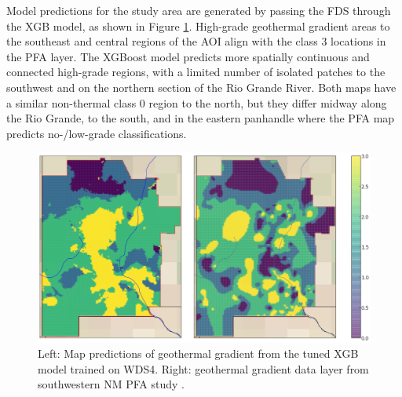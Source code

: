 Model predictions for the study area are generated by passing the FDS through the XGB model, as shown in Figure \ref{fig:xgb_final_map}. High-grade geothermal gradient areas to the southeast and central regions of the AOI align with the class 3 locations in the \citet{bielicki_hydrogeolgic_2015} PFA layer. The XGBoost model predicts more spatially continuous and connected high-grade regions, with a limited number of isolated patches to the southwest and on the northern section of the Rio Grande River. Both maps have a similar non-thermal class 0 region to the north, but they differ midway along the Rio Grande, to the south, and in the eastern panhandle where the PFA map predicts no-/low-grade classifications.

\begin{figure}[!htp]
\centering
\includegraphics[width=\textwidth]{templates/images/Figure-XGB-FinalMap_Joint.png}
\caption[XGBoost prediction map]{Left: Map predictions of geothermal gradient from the tuned XGB model trained on WDS4. Right: geothermal gradient data layer from southwestern NM PFA study \protect\citep{bielicki_hydrogeolgic_2015}.}
\label{fig:xgb_final_map}
\end{figure}




